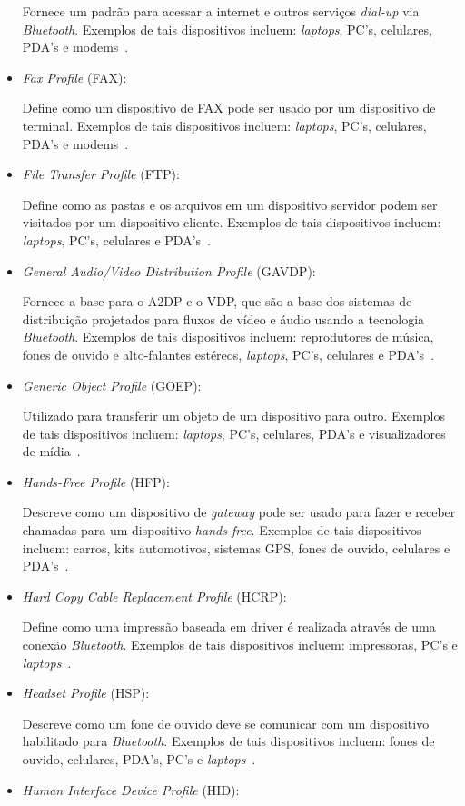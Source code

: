 \begin{itemize}
	Fornece um padrão para acessar a internet e outros serviços \emph{dial-up} via \emph{Bluetooth}. Exemplos de tais dispositivos incluem: \emph{laptops}, PC's, celulares, PDA's e modems~\cite{bluetoothprofilesDUN}.
	\item \emph{Fax Profile} (FAX): 

	Define como um dispositivo de FAX pode ser usado por um dispositivo de terminal. Exemplos de tais dispositivos incluem: \emph{laptops}, PC's, celulares, PDA's e modems~\cite{bluetoothprofilesFAX}.
	\item \emph{File Transfer Profile} (FTP): 

	Define como as pastas e os arquivos em um dispositivo servidor podem ser visitados por um dispositivo cliente. Exemplos de tais dispositivos incluem: \emph{laptops}, PC's, celulares e PDA's~\cite{bluetoothprofilesFTP}.
	\item \emph{General Audio/Video Distribution Profile} (GAVDP): 

	Fornece a base para o A2DP e o VDP, que são a base dos sistemas de distribuição projetados para fluxos de vídeo e áudio usando a tecnologia \emph{Bluetooth}. Exemplos de tais dispositivos incluem: reprodutores de música, fones de ouvido e alto-falantes estéreos, \emph{laptops}, PC's, celulares e PDA's~\cite{bluetoothprofilesGAVDP}.
	\item \emph{Generic Object Profile} (GOEP): 

	Utilizado para transferir um objeto de um dispositivo para outro. Exemplos de tais dispositivos incluem: \emph{laptops}, PC's, celulares, PDA's e visualizadores de mídia~\cite{bluetoothprofilesGOEP}.
	\item \emph{Hands-Free Profile} (HFP): 

	Descreve como um dispositivo de \emph{gateway} pode ser usado para fazer e receber chamadas para um dispositivo \emph{hands-free}. Exemplos de tais dispositivos incluem: carros, kits automotivos, sistemas GPS, fones de ouvido, celulares e PDA's~\cite{bluetoothprofilesHFP}.
	\item \emph{Hard Copy Cable Replacement Profile} (HCRP): 

	Define como uma impressão baseada em driver é realizada através de uma conexão \emph{Bluetooth}. Exemplos de tais dispositivos incluem: impressoras, PC's e \emph{laptops}~\cite{bluetoothprofilesHCRP}.
	\item \emph{Headset Profile} (HSP): 

	Descreve como um fone de ouvido deve se comunicar com um dispositivo habilitado para \emph{Bluetooth}. Exemplos de tais dispositivos incluem: fones de ouvido, celulares, PDA's, PC's e \emph{laptops}~\cite{bluetoothprofilesHSP}.
	\item \emph{Human Interface Device Profile} (HID): 


\end{itemize}
